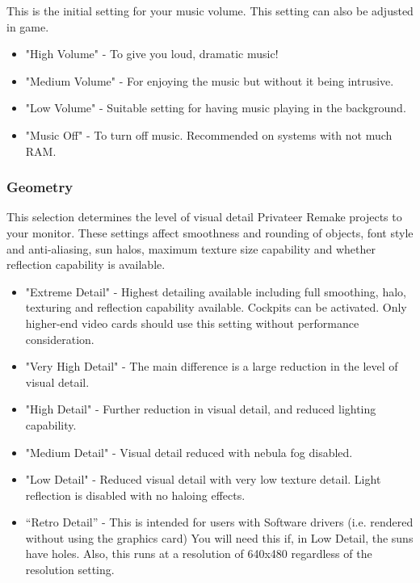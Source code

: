 \documentclass{article}
\begin{document}
This is the initial setting for your music volume. This setting can also be adjusted in game. 



\begin{itemize}
\item  "High Volume" - To give you loud, dramatic music! 

\item  "Medium Volume" - For enjoying the music but without it being intrusive. 

\item  "Low Volume" - Suitable setting for having music playing in the background.
\end{itemize}



\begin{itemize}
\item  "Music Off" - To turn off music.  Recommended on systems with not much RAM.
\end{itemize}



\subsubsection{Geometry}

This selection determines the level of visual detail Privateer Remake projects to your monitor. These settings affect smoothness and rounding of objects, font style and anti-aliasing, sun halos, maximum texture size capability and whether reflection capability is available. 



\begin{itemize}
\item  "Extreme Detail" - Highest detailing available including full smoothing, halo, texturing and reflection capability available. Cockpits can be activated. Only higher-end video cards should use this setting without performance consideration. 

\item  "Very High Detail" - The main difference is a large reduction in the level of visual detail. 

\item  "High Detail"  - Further reduction in visual detail, and reduced lighting capability. 

\item  "Medium Detail" - Visual detail reduced with nebula fog disabled. 

\item  "Low Detail" - Reduced visual detail with very low texture detail. Light reflection is disabled with no haloing  effects. 

\item  ``Retro Detail''  - This is intended for users with Software drivers (i.e. rendered without using the graphics card)   You will need this if, in Low Detail, the suns have holes.  Also, this runs at a resolution of 640x480  regardless of the resolution setting.
\end{itemize}
 
\end{document}
